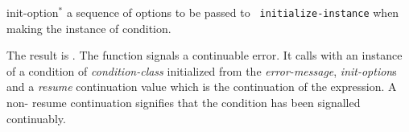 \begin{optDefinition}
\begin{arguments}
    \item[init-option\/$^*$] a sequence of options to be passed to {\tt
        initialize-instance} when making the instance of condition.
\end{arguments}
%
\result%
The result is \nil{}.
%
\remarks%
The  function signals a continuable error.  It calls
 with an instance of a condition of {\em condition-class}
initialized from the {\em error-message}, {\em init-option}\/s and a {\em
    resume} continuation value which is the continuation of the
 expression.  A non-\nil{}\/ resume continuation signifies
that the condition has been signalled continuably.
%
\end{optDefinition}
